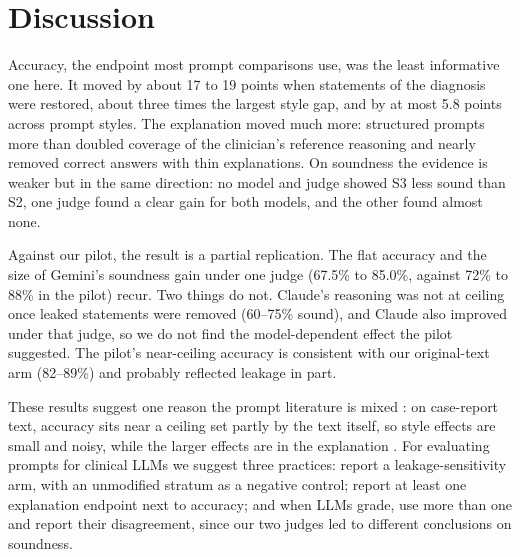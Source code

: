 \IfFileExists{IEEEtran.cls}{\ieeetrue\documentclass[conference]{IEEEtran}}{\ieeefalse\documentclass[10pt,twocolumn,letterpaper]{article}}
\begin{document}
\section{Discussion}
Accuracy, the endpoint most prompt comparisons use, was the least informative one here. It moved by about 17 to 19 points when statements of the diagnosis were restored, about three times the largest style gap, and by at most 5.8 points across prompt styles. The explanation moved much more: structured prompts more than doubled coverage of the clinician's reference reasoning and nearly removed correct answers with thin explanations. On soundness the evidence is weaker but in the same direction: no model and judge showed S3 less sound than S2, one judge found a clear gain for both models, and the other found almost none.

Against our pilot, the result is a partial replication. The flat accuracy and the size of Gemini's soundness gain under one judge (67.5\% to 85.0\%, against 72\% to 88\% in the pilot) recur. Two things do not. Claude's reasoning was not at ceiling once leaked statements were removed (60--75\% sound), and Claude also improved under that judge, so we do not find the model-dependent effect the pilot suggested. The pilot's near-ceiling accuracy is consistent with our original-text arm (82--89\%) and probably reflected leakage in part.

These results suggest one reason the prompt literature is mixed \cite{sonoda2025,chai2025,sadanandan2026,zwanzig2026}: on case-report text, accuracy sits near a ceiling set partly by the text itself, so style effects are small and noisy, while the larger effects are in the explanation \cite{savage2024,hassanein2026}. For evaluating prompts for clinical LLMs we suggest three practices: report a leakage-sensitivity arm, with an unmodified stratum as a negative control; report at least one explanation endpoint next to accuracy; and when LLMs grade, use more than one and report their disagreement, since our two judges led to different conclusions on soundness.
\end{document}
